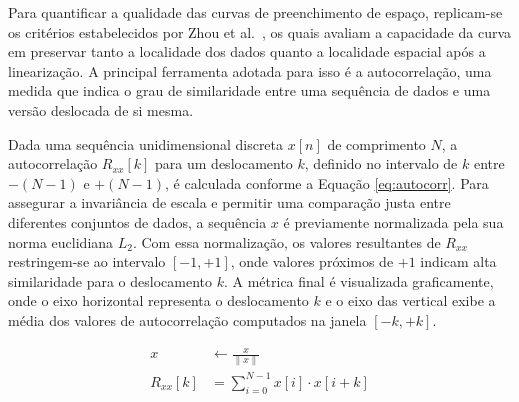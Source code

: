 \documentclass[12pt]{article}
\begin{document}

Para quantificar a qualidade das curvas de preenchimento de espaço, replicam-se os critérios estabelecidos por
Zhou et al.~\cite{zhou:20}, os quais avaliam a capacidade da curva em preservar tanto a localidade dos dados
quanto a localidade espacial após a linearização. A principal ferramenta adotada para isso é a
autocorrelação, uma medida que indica o grau de similaridade entre uma sequência de dados
e uma versão deslocada de si mesma.

Dada uma sequência unidimensional discreta $x[n]$ de comprimento $N$, a autocorrelação $R_{xx}[k]$ para um
deslocamento $k$, definido no intervalo de $k$ entre $-(N-1)$ e $+(N-1)$, é calculada conforme a Equação \ref{eq:autocorr}.
Para assegurar a invariância de escala e permitir uma comparação justa entre diferentes conjuntos de dados, a
sequência $x$ é previamente normalizada pela sua norma euclidiana $L_2$. Com essa normalização, os valores
resultantes de $R_{xx}$ restringem-se ao intervalo $[-1, +1]$, onde valores próximos de $+1$ indicam alta similaridade
para o deslocamento $k$. A métrica final é visualizada graficamente, onde o eixo horizontal representa o deslocamento
$k$ e o eixo das vertical exibe a média dos valores de autocorrelação computados na janela $[-k, +k]$.

\begin{equation} \label{eq:autocorr}
    \begin{split}
        x & \leftarrow \frac{x}{\|x\|} \\
        R_{xx}[k] & = \sum_{i=0}^{N-1} x[i] \cdot x[i+k]
    \end{split}
\end{equation} 
\end{document}
